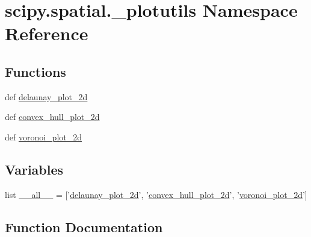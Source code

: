 \hypertarget{namespacescipy_1_1spatial_1_1__plotutils}{}\section{scipy.\+spatial.\+\_\+plotutils Namespace Reference}
\label{namespacescipy_1_1spatial_1_1__plotutils}
\subsection*{Functions}
\begin{DoxyCompactItemize}
\item 
def \hyperlink{namespacescipy_1_1spatial_1_1__plotutils_aa7664eb3a4d33c04f9d5e05e28498238}{delaunay\+\_\+plot\+\_\+2d}
\item 
def \hyperlink{namespacescipy_1_1spatial_1_1__plotutils_aa83829a1d75706b0d48617853daf2c78}{convex\+\_\+hull\+\_\+plot\+\_\+2d}
\item 
def \hyperlink{namespacescipy_1_1spatial_1_1__plotutils_a095ce70a86c69bcc1ab2157b15179293}{voronoi\+\_\+plot\+\_\+2d}
\end{DoxyCompactItemize}
\subsection*{Variables}
\begin{DoxyCompactItemize}
\item 
list \hyperlink{namespacescipy_1_1spatial_1_1__plotutils_ae5fff75bc862287f04324589312c18b8}{\+\_\+\+\_\+all\+\_\+\+\_\+} = \mbox{[}'\hyperlink{namespacescipy_1_1spatial_1_1__plotutils_aa7664eb3a4d33c04f9d5e05e28498238}{delaunay\+\_\+plot\+\_\+2d}', '\hyperlink{namespacescipy_1_1spatial_1_1__plotutils_aa83829a1d75706b0d48617853daf2c78}{convex\+\_\+hull\+\_\+plot\+\_\+2d}', '\hyperlink{namespacescipy_1_1spatial_1_1__plotutils_a095ce70a86c69bcc1ab2157b15179293}{voronoi\+\_\+plot\+\_\+2d}'\mbox{]}
\end{DoxyCompactItemize}


\subsection{Function Documentation}
\hypertarget{namespacescipy_1_1spatial_1_1__plotutils_aa83829a1d75706b0d48617853daf2c78}{}
